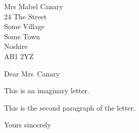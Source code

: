 \documentclass[12pt,ngerman]{scrlttr2}
\begin{document}
\begin{letter}{Mrs Mabel Canary\\24 The Street\\Some Village\\
Some Town\\Noshire\\AB1 2YZ}
  \opening{Dear Mrs~Canary}

  This is an imaginary letter.

  This is the second paragraph of the letter.

  \closing{Yours sincerely}


\end{letter}
\end{document}
